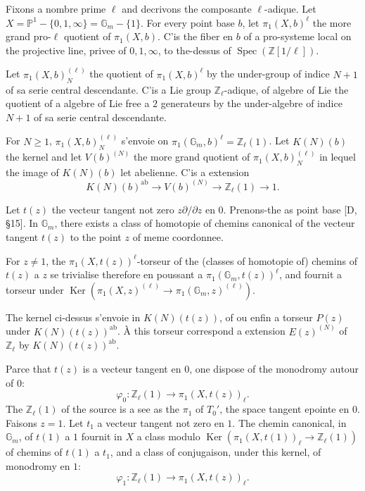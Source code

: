 \documentclass[12pt,a4paper]{article}
\theoremstyle{plain}
\theoremstyle{definition}
\theoremstyle{remark}
\DeclareMathOperator*{\Ker}{Ker}
\DeclareMathOperator{\Spec}{Spec}
\newcommand{\Z}{\mathbb{Z}}
\newcommand{\IP}{\mathbb{P}}
\newcommand{\Gm}{\mathbb{G}_m}
\newcommand{\ab}{\text{ab}}
\begin{document}
Fixons a nombre prime $\ell$ and d{e}crivons the composante $\ell$-adique. Let $X=\IP^1-\{0,1,\infty\}=\Gm-\{1\}$. For every point base $b$, let $\pi_1(X,b)^\ell$ the more grand pro-$\ell$ quotient of $\pi_1(X,b)$. C'is the fiber en $b$ of a pro-syst{e}me local on the projective line, priv{e}e of $0,1,\infty$, to the-dessus of $\Spec(\Z[1/\ell])$.

Let $\pi_1(X,b)_N^{(\ell)}$ the quotient of $\pi_1(X,b)^\ell$ by the under-group of indice $N+1$ of sa s{e}rie central descendante. C'is a Lie group $\Z_\ell$-adique, of alg{e}bre of Lie the quotient of a alg{e}bre of Lie free {a} $2$ g{e}n{e}rateurs by the under-alg{e}bre of indice $N+1$ of sa s{e}rie central descendante.

For $N\geq 1$, $\pi_1(X,b)_N^{(\ell)}$ s'envoie on $\pi_1(\Gm,b)^\ell=\Z_\ell(1)$. Let $K(N)(b)$ the kernel and let $V(b)^{(N)}$ the more grand quotient of $\pi_1(X,b)_N^{(\ell)}$ in lequel the image of $K(N)(b)$ let ab{e}lienne. C'is a extension
\begin{equation*}
K(N)(b)^{\ab} \to V(b)^{(N)} \to \Z_\ell(1) \to 1.
\end{equation*}

Let $t(z)$ the vecteur tangent not zero $z\partial/\partial z$ en $0$. Prenons-the as point base [D, \S 15]. In $\Gm$, there exists a class of homotopie of chemins canonical of the vecteur tangent $t(z)$ to the point $z$ of m{e}me coordonn{e}e.

For $z\neq 1$, the $\pi_1(X,t(z))^\ell$-torseur of the (classes of homotopie of) chemins of $t(z)$ {a} $z$ se trivialise therefore en poussant {a} $\pi_1(\Gm,t(z))^\ell$, and fournit a torseur under $\Ker(\pi_1(X,z)^{(\ell)}\to\pi_1(\Gm,z)^{(\ell)})$.

The kernel ci-dessus s'envoie in $K(N)(t(z))$, of o{u} enfin a torseur $P(z)$ under $K(N)(t(z))^{\ab}$. {\`A} this torseur correspond a extension $E(z)^{(N)}$ of $\Z_\ell$ by $K(N)(t(z))^{\ab}$.

Parce that $t(z)$ is a vecteur tangent en $0$, one dispose of the monodromy autour of $0$:
\begin{equation*}
\varphi_0 : \Z_\ell(1) \longrightarrow \pi_1(X,t(z))_\ell.
\end{equation*}
The $\Z_\ell(1)$ of the source is {a} see as the $\pi_1$ of $T_0'$, the space tangent {e}point{e} en $0$. Faisons $z=1$. Let $t_1$ a vecteur tangent not zero en $1$. The chemin canonical, in $\Gm$, of $t(1)$ {a} $1$ fournit in $X$ a class modulo $\Ker(\pi_1(X,t(1))_\ell\to\Z_\ell(1))$ of chemins of $t(1)$ {a} $t_1$, and a class of conjugaison, under this kernel, of monodromy en $1$:
\begin{equation*}
\varphi_1 : \Z_\ell(1) \longrightarrow \pi_1(X,t(z))_\ell.
\end{equation*}
\end{document}
